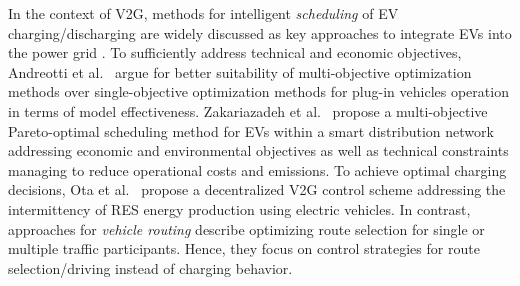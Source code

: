 In the context of V2G, methods for intelligent \textit{scheduling} of EV charging/discharging are widely discussed as key approaches to integrate EVs into the power grid 
\cite{yang2015computational}.
To sufficiently address technical and economic objectives, Andreotti et al.~\cite{andreotti2012review} argue for better suitability of multi-objective optimization methods over single-objective optimization methods for plug-in vehicles operation in terms of model effectiveness.
Zakariazadeh et al.~\cite{zakariazadeh2014multi} propose a multi-objective Pareto-optimal scheduling method for EVs within a smart distribution network addressing economic and environmental objectives as well as technical constraints managing to reduce operational costs and emissions.
To achieve optimal charging decisions, Ota et al.~\cite{ota2012autonomous} propose a decentralized V2G control scheme addressing the intermittency of RES energy production using electric vehicles. 
In contrast, approaches for \textit{vehicle routing} describe optimizing route selection for single or multiple traffic participants. Hence, they focus on control strategies for route selection/driving instead of charging behavior. 
